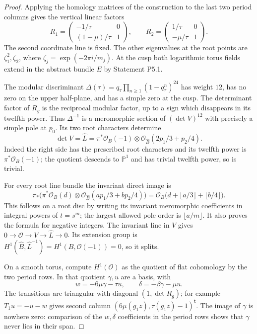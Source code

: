 \begin{proof}
Applying the homology matrices of the construction to the last two
period columns gives the vertical linear factors
\[
 R_1=\begin{pmatrix}-1/\tau&0\\(1-\mu)/\tau&1\end{pmatrix},\qquad
 R_2=\begin{pmatrix}1/\tau&0\\-\mu/\tau&1\end{pmatrix}.
\]
The second coordinate line is fixed.  The other eigenvalues at the root
points are $\zeta_1^2,\zeta_2$, where
$\zeta_j=\exp(-2\pi i/m_j)$.  At the cusp both logarithmic torus fields
extend in the abstract bundle $E$ by Statement P5.1.

The modular discriminant
$\Delta(\tau)=q_\tau\prod_{n\geq1}(1-q_\tau^n)^{24}$ has weight $12$,
has no zero on the upper half-plane, and has a simple zero at the cusp.
The determinant factor of $R_g$ is the reciprocal modular factor, up to
a sign which disappears in its twelfth power.  Thus $\Delta^{-1}$ is a
meromorphic section of $(\det V)^{12}$ with precisely a simple pole at
$p_0$.  Its two root characters determine
\begin{equation}\label{eq:P5L}
 \det V=\widehat L
 =\pi^*\mathcal O_B(-1)\otimes
   \mathcal O_{\widehat B}(2p_1/3+p_2/4).
\end{equation}
Indeed the right side has the prescribed root characters and its
twelfth power is $\pi^*\mathcal O_B(-1)$; the quotient descends to
$\mathbb P^1$ and has trivial twelfth power, so is trivial.

For every root line bundle the invariant direct image is
\begin{equation}\label{eq:P5floor}
 \pi_*\bigl(\pi^*\mathcal O_B(d)\otimes
 \mathcal O_{\widehat B}(ap_1/3+bp_2/4)\bigr)
 =\mathcal O_B\bigl(d+\lfloor a/3\rfloor+\lfloor b/4\rfloor\bigr).
\end{equation}
This follows on a root disc by writing its invariant meromorphic
coefficients in integral powers of $t=s^m$; the largest allowed pole
order is $\lfloor a/m\rfloor$.  It also proves the formula for negative
integers.  The invariant line in $V$ gives
$0\to\mathcal O\to V\to\widehat L\to0$.  Its extension group is
$H^1(\widehat B,\widehat L^{-1})=H^1(B,\mathcal O(-1))=0$, so it splits.

On a smooth torus, compute $H^1(\mathcal O)$ as the quotient of flat
cohomology by the two period rows.  In that quotient $\gamma,u$ are a
basis, with
\[
 w=-6\mu\gamma-\tau u,\qquad \delta=-\beta\gamma-\mu u.
\]
The transitions are triangular with diagonal $(1,\det R_g)$; for example
$T_1u=-u-w$ gives second column
$(6\mu(g_1z),\tau(g_1z)-1)^{\mathsf t}$.  The image of $\gamma$ is
nowhere zero: comparison of the $w,\delta$ coefficients in the period
rows shows that $\gamma$ never lies in their span.


\end{proof}
